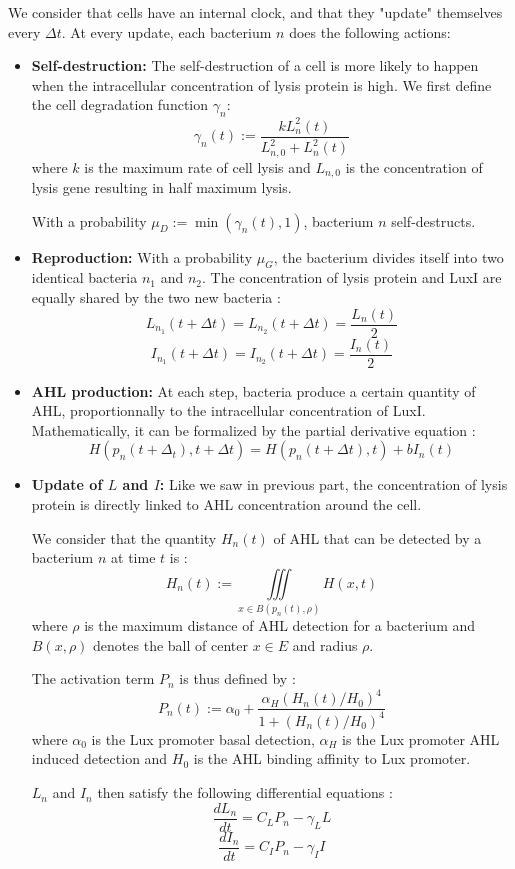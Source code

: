 \documentclass[a4paper]{article}
\theoremstyle{definition}
\begin{document}
We consider that cells have an internal clock, and that they "update" themselves every $\Delta t$. At every update, each bacterium $n$ does the following actions:
\begin{itemize}

\item \textbf{Self-destruction:} The self-destruction of a cell is more likely to happen when the intracellular concentration of lysis protein is high. We first define the cell degradation function $\gamma_n$:
$$\gamma_n(t) := \frac{kL_n^2(t)}{L_{n,0}^2 + L_n^2(t)}$$
where $k$ is the maximum rate of cell lysis and $L_{n,0}$ is the concentration of lysis gene resulting in half maximum lysis.

With a probability $\mu_D := \min(\gamma_n(t), 1)$, bacterium $n$ self-destructs.


\item \textbf{Reproduction:} With a probability $\mu_G$, the bacterium divides itself into two identical bacteria $n_1$ and $n_2$. The concentration of lysis protein and LuxI are equally shared by the two new bacteria :
\begin{equation}
L_{n_1}(t+\Delta t) =  L_{n_2}(t+\Delta t) = \frac{L_n(t)}{2}
\end{equation}
\begin{equation}
I_{n_1}(t+\Delta t) =  I_{n_2}(t+\Delta t) = \frac{I_n(t)}{2}
\end{equation}


\item \textbf{AHL production:} At each step, bacteria produce a certain quantity of AHL, proportionnally to the intracellular concentration of LuxI. Mathematically, it can be formalized by the partial derivative equation :
$$H(p_n(t+\Delta_t), t+\Delta t) = H(p_n(t+\Delta t),t) +  bI_n(t)$$

\item \textbf{Update of $L$ and $I$:} Like we saw in previous part, the concentration of lysis protein is directly linked to AHL concentration around the cell.

We consider that the quantity $H_n(t)$ of AHL that can be detected by a bacterium $n$ at time $t$ is :
$$H_n(t) := \iiint \limits_{x \in B(p_n(t), \rho)} H(x, t)$$
where $\rho$ is the maximum distance of AHL detection for a bacterium and $B(x, \rho)$ denotes the ball of center $x \in E$ and radius $\rho$.

The activation term $P_n$ is thus defined by :
$$P_n(t) := \alpha_0 + \frac{\alpha_H(H_n(t)/H_0)^4}{1 + (H_n(t)/H_0)^4}$$
where $\alpha_0$ is the Lux promoter basal detection, $\alpha_H$ is the Lux promoter AHL induced detection and $H_0$ is the AHL binding affinity to Lux promoter.

$L_n$ and $I_n$ then satisfy the following differential equations :
\begin{equation}
\frac{d L_n}{d t} = C_L P_n - \gamma_L L
\end{equation}
\begin{equation}
\frac{d I_n}{d t} = C_I P_n - \gamma_I I
\end{equation}
\end{itemize}
\end{document}
